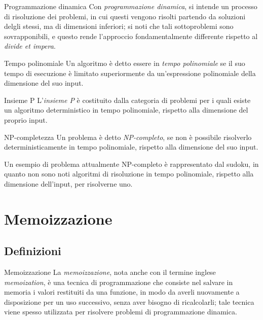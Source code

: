 \documentclass[a4paper, 12pt]{report}
\begin{document}
    \begin{frameddefn}{Programmazione dinamica}
        Con \textit{programmazione dinamica}, si intende un processo di risoluzione dei problemi, in cui questi vengono risolti partendo da soluzioni delgli stessi, ma di dimensioni inferiori; si noti che tali sottoproblemi sono sovrapponibili, e questo rende l'approccio fondamentalmente differente rispetto al \textit{divide et impera}.
    \end{frameddefn}

    \begin{frameddefn}{Tempo polinomiale}
        Un algoritmo è detto essere in \textit{tempo polinomiale} se il suo tempo di esecuzione è limitato superiormente da un'espressione polinomiale della dimensione del suo input.
    \end{frameddefn}

    \begin{frameddefn}{Insieme P}
        L'\textit{insieme P} è costituito dalla categoria di problemi per i quali esiste un algoritmo deterministico in tempo polinomiale, rispetto alla dimensione del proprio input.
    \end{frameddefn}

    \begin{frameddefn}{NP-completezza}
        Un problema è detto \textit{NP-completo}, se non è possibile risolverlo deterministicamente in tempo polinomiale, rispetto alla dimensione del suo input.
    \end{frameddefn}

    \begin{example}
        Un esempio di problema attualmente NP-completo è rappresentato dal sudoku, in quanto non sono noti algoritmi di risoluzione in tempo polinomiale, rispetto alla dimensione dell'input, per risolverne uno.
    \end{example}

    \section{Memoizzazione}

    \subsection{Definizioni}

    \begin{frameddefn}{Memoizzazione}
        La \textit{memoizzazione}, nota anche con il termine inglese \textit{memoization}, è una tecnica di programmazione che consiste nel salvare in memoria i valori restituiti da una funzione, in modo da averli nuovamente a disposizione per un uso successivo, senza aver bisogno di ricalcolarli; tale tecnica viene spesso utilizzata per risolvere problemi di programmazione dinamica.
    \end{frameddefn}
\end{document}
